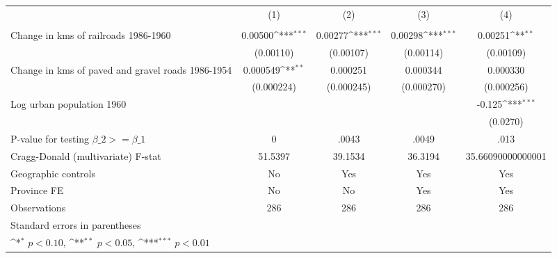{
\def\sym#1{\ifmmode^{#1}\else\(^{#1}\)\fi}
\begin{tabular}{l*{4}{c}}
\hline\hline
                &\multicolumn{1}{c}{(1)}&\multicolumn{1}{c}{(2)}&\multicolumn{1}{c}{(3)}&\multicolumn{1}{c}{(4)}\\
                &\multicolumn{1}{c}{}&\multicolumn{1}{c}{}&\multicolumn{1}{c}{}&\multicolumn{1}{c}{}\\
\hline
Change in kms of railroads 1986-1960&  0.00500\sym{***}&  0.00277\sym{***}&  0.00298\sym{***}&  0.00251\sym{**} \\
                &(0.00110)         &(0.00107)         &(0.00114)         &(0.00109)         \\
[1em]
Change in kms of paved and gravel roads 1986-1954& 0.000549\sym{**} & 0.000251         & 0.000344         & 0.000330         \\
                &(0.000224)         &(0.000245)         &(0.000270)         &(0.000256)         \\
[1em]
Log urban population 1960&                  &                  &                  &   -0.125\sym{***}\\
                &                  &                  &                  & (0.0270)         \\
\hline
P-value for testing $\beta\_{2} >= \beta\_{1}$&        0         &    .0043         &    .0049         &     .013         \\
Cragg-Donald (multivariate) F-stat&  51.5397         &  39.1534         &  36.3194         &35.66090000000001         \\
Geographic controls&       No         &      Yes         &      Yes         &      Yes         \\
Province FE     &       No         &       No         &      Yes         &      Yes         \\
Observations    &      286         &      286         &      286         &      286         \\
\hline\hline
\multicolumn{5}{l}{\footnotesize Standard errors in parentheses}\\
\multicolumn{5}{l}{\footnotesize \sym{*} \(p<0.10\), \sym{**} \(p<0.05\), \sym{***} \(p<0.01\)}\\
\end{tabular}
}

